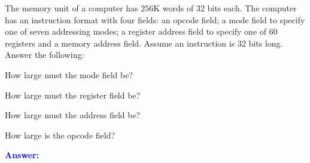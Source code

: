 \item{}
The memory unit of a computer has $256$K words of $32$ bits each. The computer
has an instruction format with four fields: an opcode field; a mode field to
specify one of seven addressing modes; a register address field to specify one
of $60$ registers and a memory address field. Assume an instruction is $32$
bits long. Answer the following:
\begin{list}{\textbf{)}}{}
    \item How large must the mode field be?
    \item How large must the register field be?
    \item How large must the address field be?
    \item How large is the opcode field?
\end{list}
\vskip12pt
\ifanswers
\textcolor{blue}{
\textbf{Answer:}\\
}
\newpage
\fi
